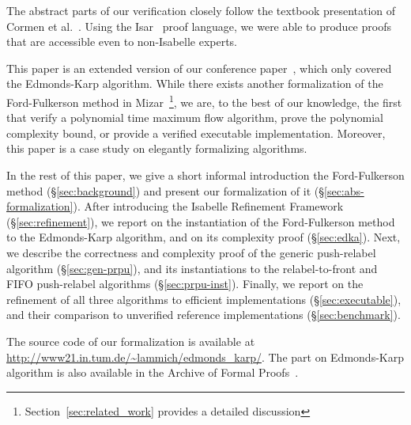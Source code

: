 \documentclass[smallcondensed]{svjour3}     %
\begin{document}
The abstract parts of our verification closely follow the textbook presentation of Cormen et al.~\cite{CLRS09}. 
Using the Isar~\cite{Wenzel99} proof language, we were able to produce proofs that are accessible even to non-Isabelle experts.

This paper is an extended version of our conference paper~\cite{LaSe16}, which only covered the Edmonds-Karp algorithm.
While there exists another formalization of the Ford-Fulkerson method in Mizar~\cite{Lee05}\footnote{Section~\ref{sec:related_work} provides a detailed discussion}, we are, to the best of our knowledge, the first that verify a polynomial time maximum flow algorithm, prove the polynomial complexity bound, or provide a verified executable implementation. Moreover, this paper is a case study on elegantly formalizing algorithms.

In the rest of this paper, we give a short informal introduction the Ford-Fulkerson method (\S\ref{sec:background})
and present our formalization of it (\S\ref{sec:abs-formalization}). After introducing the Isabelle Refinement Framework~\cite{LaTu12,La12} (\S\ref{sec:refinement}), we report on the instantiation of the Ford-Fulkerson method to the Edmonds-Karp algorithm, and on its complexity proof (\S\ref{sec:edka}).
Next, we describe the correctness and complexity proof of the generic push-relabel algorithm (\S\ref{sec:gen-prpu}), and its instantiations 
to the relabel-to-front and FIFO push-relabel algorithms (\S\ref{sec:prpu-inst}).
Finally, we report on the refinement of all three algorithms to efficient implementations (\S\ref{sec:executable}), and their comparison to unverified reference 
implementations (\S\ref{sec:benchmark}).

The source code of our formalization is available at \url{http://www21.in.tum.de/~lammich/edmonds_karp/}. 
The part on Edmonds-Karp algorithm is also available in the Archive of Formal Proofs~\cite{LaSe16_afp}.


\end{document}
